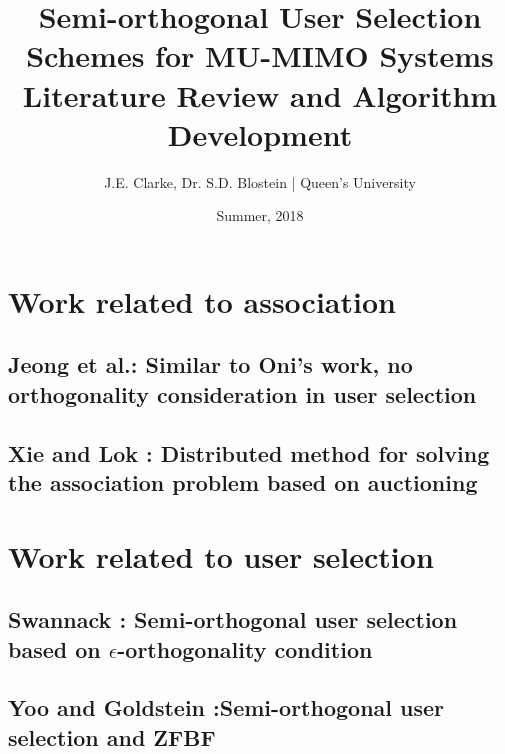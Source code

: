 \documentclass[11pt]{report}
\title{Semi-orthogonal User Selection Schemes for MU-MIMO Systems\\ Literature Review and Algorithm Development}
\author{J.E. Clarke, Dr. S.D. Blostein | Queen's University}
\date{Summer, 2018}
\begin{document}
	\maketitle
	\newpage
    \section{Work related to association}
    	\subsection{Jeong et al.\cite{7354607}: Similar to Oni's work, no orthogonality consideration in user selection}
            	
        \subsection{Xie and Lok \cite{7510766}: Distributed method for solving the association problem based on auctioning}
            
    
    \section{Work related to user selection}
        \subsection{Swannack \cite{1549555}: Semi-orthogonal user selection based on $\epsilon$-orthogonality condition}
            
            
        \subsection{Yoo and Goldstein \cite{1603708}:Semi-orthogonal user selection and ZFBF }
            
	\newpage	
 	\begingroup
 		\renewcommand{\section}[2]{}%
 		
 		
 	\endgroup
\end{document}
